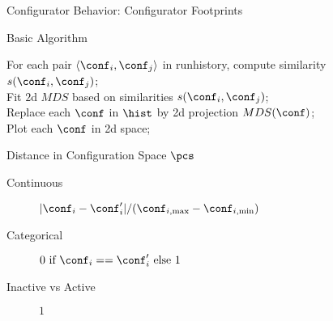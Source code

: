 \begin{frame}[c]{Configurator Behavior: Configurator Footprints}

\begin{block}{Basic Algorithm}
\LinesNotNumbered
\begin{algorithm}[H]
\BlankLine
For each pair $\langle\conf_i,\conf_j\rangle$ in runhistory, compute similarity $s(\conf_i,\conf_j)$;\\
Fit $2$d $MDS$ based on similarities $s(\conf_i,\conf_j)$;\\
Replace each $\conf$ in $\hist$ by 2d projection $MDS(\conf)$;\\
Plot each $\conf$ in 2d space;\\
\caption{Configurator Footprint (Visualization of a runhistory)}
\label{algo:confvis}
\end{algorithm}
\end{block}

\pause

\begin{block}{Distance in Configuration Space $\pcs$ }
\begin{description}
  \item[Continuous] $|\conf_i - \conf'_i| / (\conf_{i, \text{max}} - \conf_{i, \text{min}})$ 
  \item[Categorical] $0 \text{ if } \conf_i == \conf'_i \text{ else } 1$
  \item[Inactive vs Active] $1$
\end{description}

\end{block}

\end{frame}

